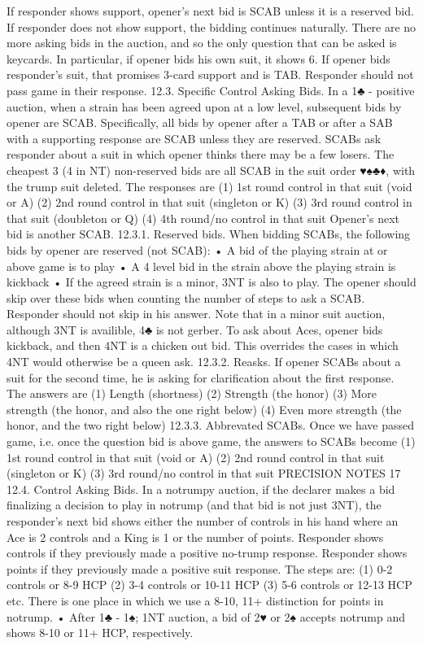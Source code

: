 \documentclass[10pt]{article}
\begin{document}
\begin{multicols*}{2}
If responder shows support, opener’s next bid is SCAB unless it is a reserved
bid. If responder does not show support, the bidding continues naturally. There
are no more asking bids in the auction, and so the only question that can be
asked is keycards. In particular, if opener bids his own suit, it shows 6. If
opener bids responder’s suit, that promises 3-card support and is TAB. Responder
should not pass game in their response. 12.3. Specific Control Asking Bids. In a
1♣ - positive auction, when a strain has been agreed upon at a low level,
subsequent bids by opener are SCAB. Specifically, all bids by opener after a TAB
or after a SAB with a supporting response are SCAB unless they are reserved.
SCABs ask responder about a suit in which opener thinks there may be a few
losers. The cheapest 3 (4 in NT) non-reserved bids are all SCAB in the suit
order ♥♠♣♦, with the trump suit deleted. The responses are (1) 1st round control
in that suit (void or A) (2) 2nd round control in that suit (singleton or K) (3)
3rd round control in that suit (doubleton or Q) (4) 4th round/no control in that
suit Opener’s next bid is another SCAB. 12.3.1. Reserved bids. When bidding
SCABs, the following bids by opener are reserved (not SCAB): • A bid of the
playing strain at or above game is to play • A 4 level bid in the strain above
the playing strain is kickback • If the agreed strain is a minor, 3NT is also to
play. The opener should skip over these bids when counting the number of steps
to ask a SCAB. Responder should not skip in his answer. Note that in a minor
suit auction, although 3NT is availible, 4♣ is not gerber. To ask about Aces,
opener bids kickback, and then 4NT is a chicken out bid. This overrides the
cases in which 4NT would otherwise be a queen ask. 12.3.2. Reasks. If opener
SCABs about a suit for the second time, he is asking for clarification about the
first response. The answers are (1) Length (shortness) (2) Strength (the honor)
(3) More strength (the honor, and also the one right below) (4) Even more
strength (the honor, and the two right below) 12.3.3. Abbrevated SCABs. Once we
have passed game, i.e. once the question bid is above game, the answers to SCABs
become (1) 1st round control in that suit (void or A) (2) 2nd round control in
that suit (singleton or K) (3) 3rd round/no control in that suit PRECISION NOTES
17 12.4. Control Asking Bids. In a notrumpy auction, if the declarer makes a bid
finalizing a decision to play in notrump (and that bid is not just 3NT), the
responder’s next bid shows either the number of controls in his hand where an
Ace is 2 controls and a King is 1 or the number of points. Responder shows
controls if they previously made a positive no-trump response. Responder shows
points if they previously made a positive suit response. The steps are: (1) 0-2
controls or 8-9 HCP (2) 3-4 controls or 10-11 HCP (3) 5-6 controls or 12-13 HCP
etc. There is one place in which we use a 8-10, 11+ distinction for points in
notrump. • After 1♣ - 1♠; 1NT auction, a bid of 2♥ or 2♠ accepts notrump and
shows 8-10 or 11+ HCP, respectively.
\newpage


\end{multicols*}
\end{document}
